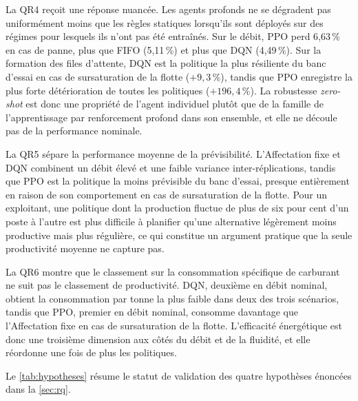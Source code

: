 \documentclass[11pt,a4paper]{article}
\begin{document}
La QR4 reçoit une réponse nuancée. Les agents profonds ne se dégradent pas uniformément moins que les règles statiques lorsqu'ils sont déployés sur des régimes pour lesquels ils n'ont pas été entraînés. Sur le débit, PPO perd 6,63\,\% en cas de panne, plus que FIFO (5,11\,\%) et plus que DQN (4,49\,\%). Sur la formation des files d'attente, DQN est la politique la plus résiliente du banc d'essai en cas de sursaturation de la flotte ($+9{,}3\,\%$), tandis que PPO enregistre la plus forte détérioration de toutes les politiques ($+196{,}4\,\%$). La robustesse \textit{zero-shot} est donc une propriété de l'agent individuel plutôt que de la famille de l'apprentissage par renforcement profond dans son ensemble, et elle ne découle pas de la performance nominale.

La QR5 sépare la performance moyenne de la prévisibilité. L'Affectation fixe et DQN combinent un débit élevé et une faible variance inter-réplications, tandis que PPO est la politique la moins prévisible du banc d'essai, presque entièrement en raison de son comportement en cas de sursaturation de la flotte. Pour un exploitant, une politique dont la production fluctue de plus de six pour cent d'un poste à l'autre est plus difficile à planifier qu'une alternative légèrement moins productive mais plus régulière, ce qui constitue un argument pratique que la seule productivité moyenne ne capture pas.

La QR6 montre que le classement sur la consommation spécifique de carburant ne suit pas le classement de productivité. DQN, deuxième en débit nominal, obtient la consommation par tonne la plus faible dans deux des trois scénarios, tandis que PPO, premier en débit nominal, consomme davantage que l'Affectation fixe en cas de sursaturation de la flotte. L'efficacité énergétique est donc une troisième dimension aux côtés du débit et de la fluidité, et elle réordonne une fois de plus les politiques.

Le \cref{tab:hypotheses} résume le statut de validation des quatre hypothèses énoncées dans la \cref{sec:rq}.
\end{document}

